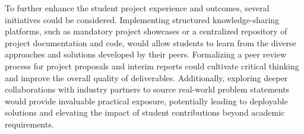 \documentclass[11pt,a4paper]{article}
\newenvironment{card}{
    \begin{tcolorbox}[
        enhanced,
        colback=cardback,
        colframe=border,
        sharp corners,
        boxrule=0.5pt,
        drop shadow,
        drop shadow={shadow xshift=1mm,shadow yshift=-1mm,fill=border!50},
        boxsep=3mm,
        left=5mm, right=5mm, top=5mm, bottom=5mm,
        width=\textwidth,
        nobeforeafter
    ]
}{\end{tcolorbox}}
\begin{document}
\begin{card}
    To further enhance the student project experience and outcomes, several initiatives could be considered. Implementing structured knowledge-sharing platforms, such as mandatory project showcases or a centralized repository of project documentation and code, would allow students to learn from the diverse approaches and solutions developed by their peers. Formalizing a peer review process for project proposals and interim reports could cultivate critical thinking and improve the overall quality of deliverables. Additionally, exploring deeper collaborations with industry partners to source real-world problem statements would provide invaluable practical exposure, potentially leading to deployable solutions and elevating the impact of student contributions beyond academic requirements.
\end{card}
\end{document}
